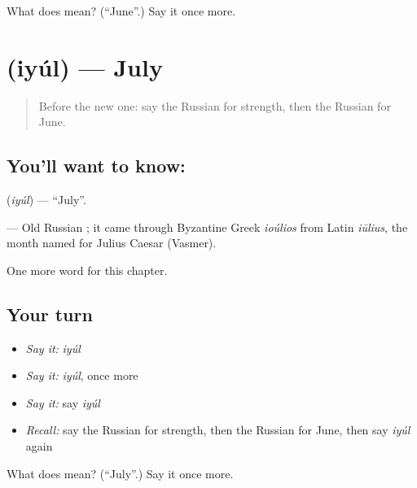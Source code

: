\begin{tcolorbox}[breakable,colback=teal!4,colframe=teal!35!black,title={Before you move on}]
What does  mean? (\textquotedblleft{}June\textquotedblright{}.) Say it once more.
\end{tcolorbox}
\section[\texorpdfstring{\ru{июль} (iyúl)}{июль (iyúl)}]{ (iyúl) — July}

\label{lesson:RU-C212-iyul}



\begin{quote}
Before the new one: say the Russian for strength, then the Russian for June.
\end{quote}

\subsection*{You'll want to know: }
\textbf{} (\emph{iyúl}) — \textquotedblleft{}July\textquotedblright{}.

\begin{cousinweb}
\textbf{} — Old Russian \emph{}; it came through Byzantine Greek \emph{ioúlios} from Latin \emph{iūlius}, the month named for Julius Caesar (Vasmer).
\end{cousinweb}

\begin{grammarlens}[title={What you've built}]
One more word for this chapter.
\end{grammarlens}

\subsection*{Your turn}
\begin{itemize}
\raggedright
  \item \emph{Say it:} \emph{iyúl}
  \item \emph{Say it:} \emph{iyúl}, once more
  \item \emph{Say it:} say \emph{iyúl}
  \item \emph{Recall:} say the Russian for strength, then the Russian for June, then say \emph{iyúl} again
\end{itemize}

\begin{tcolorbox}[breakable,colback=teal!4,colframe=teal!35!black,title={Before you move on}]
What does  mean? (\textquotedblleft{}July\textquotedblright{}.) Say it once more.
\end{tcolorbox}
